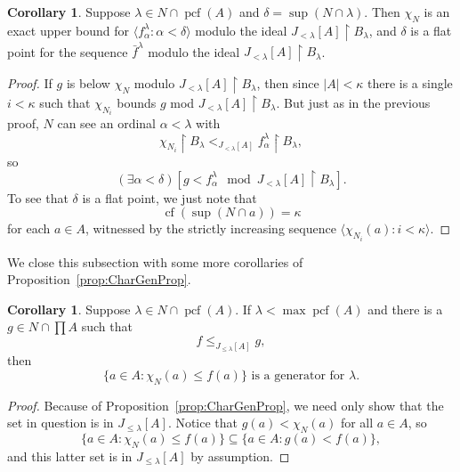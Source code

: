 \documentclass[10pt]{amsart}
\theoremstyle{plain}
\theoremstyle{definition}
\newtheorem{corollary}[proposition]{Corollary}
\theoremstyle{remark}
\DeclareMathOperator{\cf}{cf}
\DeclareMathOperator{\pcf}{pcf}
\numberwithin{equation}{section}
\begin{document}
\begin{corollary}
Suppose $\lambda\in N\cap\pcf(A)$ and $\delta = \sup(N\cap\lambda)$.  Then $\chi_N$ is an exact upper bound for $\langle f^\lambda_\alpha:\alpha<\delta\rangle$
modulo the ideal $J_{<\lambda}[A]\restriction B_\lambda$, and $\delta$ is a flat point for the sequence $\bar{f}^\lambda$ modulo
the ideal $J_{<\lambda}[A]\restriction B_\lambda$.
\end{corollary}
\begin{proof}
If $g$ is below $\chi_N$ modulo $J_{<\lambda}[A]\restriction B_\lambda$, then since $|A|<\kappa$ there is a single $i<\kappa$
such that $\chi_{N_i}$ bounds $g$ mod $J_{<\lambda}[A]\restriction B_\lambda$.  But just as in the previous proof, $N$ can see an ordinal
$\alpha<\lambda$ with
\begin{equation}
\chi_{N_i}\restriction B_\lambda<_{J_{<\lambda}[A]} f^\lambda_\alpha\restriction B_\lambda,
\end{equation}
so
\begin{equation}
(\exists \alpha<\delta)\left[ g < f^\lambda_\alpha\mod J_{<\lambda}[A]\restriction B_\lambda\right].
\end{equation}
To see that $\delta$ is a flat point, we just note that
\begin{equation}
\cf(\sup(N\cap a)) = \kappa
\end{equation}
for each $a\in A$, witnessed by the strictly increasing sequence $\langle \chi_{N_i}(a):i<\kappa\rangle$.
\end{proof}

We close this subsection with some more  corollaries of Proposition~\ref{prop:CharGenProp}.


\begin{corollary}
Suppose $\lambda\in N\cap\pcf(A)$.  If $\lambda<\max\pcf(A)$  and there is a $g\in N\cap\prod A$ such that
\begin{equation}
f\leq_{J_{\leq\lambda}[A]}g,
\end{equation}
then
\begin{equation}
\{a\in A: \chi_N(a)\leq f(a)\}\text{ is a generator for }\lambda.
\end{equation}
\end{corollary}
\begin{proof}
Because of Proposition~\ref{prop:CharGenProp}, we need only show that the set in question is in $J_{\leq\lambda}[A]$. Notice that
$g(a)<\chi_N(a)$ for all $a\in A$, so
\begin{equation}
\{a\in A: \chi_N(a)\leq f(a)\}\subseteq\{a\in A: g(a)<f(a)\},
\end{equation}
and this latter set is in $J_{\leq\lambda}[A]$ by assumption.
\end{proof}
\end{document}
